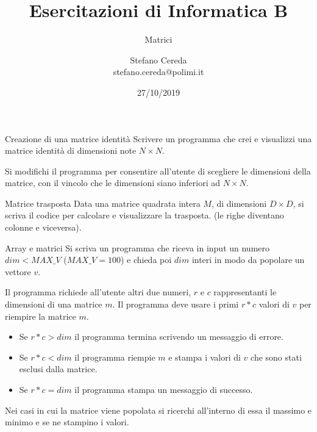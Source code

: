 \documentclass[aspectratio=169, handout]{beamer}
\title{Esercitazioni di Informatica B}
\subtitle{Matrici}
\author{Stefano Cereda\\
	stefano.cereda@polimi.it
}
\date{27/10/2019}
\institute[PoliMi]{Politecnico Milano}
\begin{document}
	\begin{frame}
	\maketitle
    \end{frame}


\begin{frame}{Creazione di una matrice identità}
Scrivere un programma che crei e visualizzi una matrice identità di dimensioni note $N \times N$.

Si modifichi il programma per consentire all'utente di scegliere le dimensioni della matrice, con il vincolo che le
    dimensioni siano inferiori ad $N \times N$.
\end{frame}

\begin{frame}{Matrice trasposta}
Data una matrice quadrata intera $M$, di dimensioni $D \times D$, si scriva il codice per calcolare e visualizzare la trasposta. (le righe diventano colonne e viceversa).
\end{frame}

\begin{frame}[allowframebreaks]{Array e matrici}
Si scriva un programma che riceva in input un numero $dim<MAX\_V$ ($MAX\_V=100$) e chieda poi $dim$ interi in modo da popolare un vettore $v$.

Il programma richiede all’utente altri due numeri, $r$ e $c$ rappresentanti le dimensioni di una matrice $m$.
Il programma deve usare i primi $r*c$ valori di $v$ per riempire la matrice $m$.

\begin{itemize}
	\item Se $r*c > dim$ il programma termina scrivendo un messaggio di errore.
	\item Se $r*c < dim$ il programma riempie $m$ e stampa i valori di $v$ che sono stati esclusi
	dalla matrice.
	\item Se $r*c = dim$ il programma stampa un messaggio di successo.
\end{itemize}

Nei casi in cui la matrice viene popolata si ricerchi all’interno di essa il massimo e minimo e se ne
stampino i valori.
\end{frame}
\end{document}
